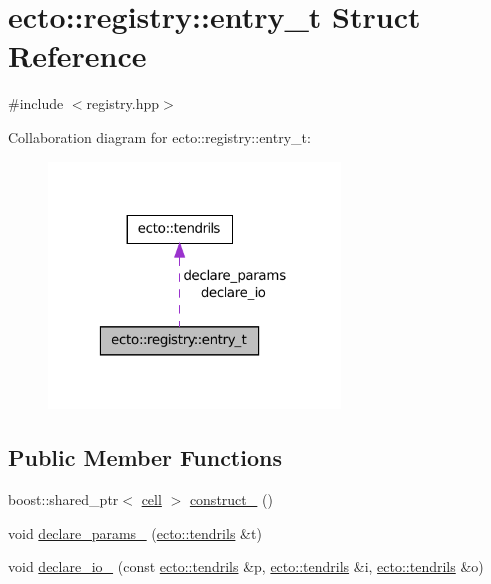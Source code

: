 \hypertarget{structecto_1_1registry_1_1entry__t}{\section{ecto\-:\-:registry\-:\-:entry\-\_\-t \-Struct \-Reference}
\label{structecto_1_1registry_1_1entry__t}
}


{\ttfamily \#include $<$registry.\-hpp$>$}



\-Collaboration diagram for ecto\-:\-:registry\-:\-:entry\-\_\-t\-:\nopagebreak
\begin{figure}[H]
\begin{center}
\leavevmode
\includegraphics[width=220pt]{structecto_1_1registry_1_1entry__t__coll__graph}
\end{center}
\end{figure}
\subsection*{\-Public \-Member \-Functions}
\begin{DoxyCompactItemize}
\item 
boost\-::shared\-\_\-ptr$<$ \hyperlink{structecto_1_1cell}{cell} $>$ \hyperlink{structecto_1_1registry_1_1entry__t_a6690e4cc01562d27df2cca184cdd06e0}{construct\-\_\-} ()
\item 
void \hyperlink{structecto_1_1registry_1_1entry__t_af0aeb9fd69fc09b5a2b5f82841cba647}{declare\-\_\-params\-\_\-} (\hyperlink{classecto_1_1tendrils}{ecto\-::tendrils} \&t)
\item 
void \hyperlink{structecto_1_1registry_1_1entry__t_a079fd7bed79b335a8fa74c68a4ccf988}{declare\-\_\-io\-\_\-} (const \hyperlink{classecto_1_1tendrils}{ecto\-::tendrils} \&p, \hyperlink{classecto_1_1tendrils}{ecto\-::tendrils} \&i, \hyperlink{classecto_1_1tendrils}{ecto\-::tendrils} \&o)
\end{DoxyCompactItemize}
